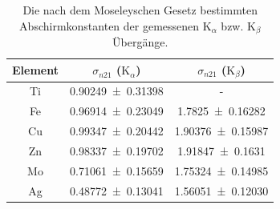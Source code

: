 \documentclass[
	a4paper,
	12pt,
	pagesize,
	ngerman
]{scrartcl}
\begin{document}
	\begin{table}[H] %
		\centering
		\begin{tabular}{ c | c | c}
			Element & $\sigma_{n21}$ ($\text{K}_\alpha$) &  $\sigma_{n21}$  ($\text{K}_\beta$)\\ \hline \hline %
			Ti & \SI{0,90249+-0,31398}{} & - \\
			Fe & \SI{0,96914+-0,23049}{} & \SI{1,7825+-0,16282}{} \\
			Cu & \SI{0,99347+-0,20442}{} & \SI{1,90376+-0,15987}{} \\
			Zn & \SI{0.98337+-0.19702}{} & \SI{1.91847+-0.1631}{} \\
			Mo & \SI{0,71061+-0,15659}{} & \SI{1,75324+-0,14985}{} \\
			Ag & \SI{0,48772+-0,13041}{} & \SI{1,56051+-0,12030}{} \\
		\end{tabular}
	\caption{Die nach dem Moseleyschen Gesetz bestimmten Abschirmkonstanten der gemessenen $\text{K}_\alpha$ bzw. $\text{K}_\beta$ Übergänge.}
	\label{tb_abschirm}
	\end{table}
\end{document}
